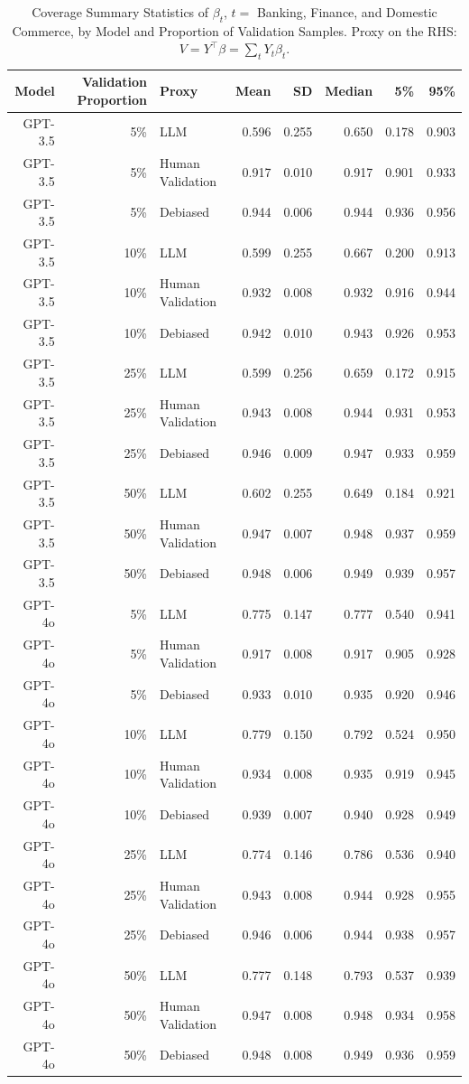 \begin{table}

\caption{\label{tab:unnamed-chunk-1}Coverage Summary Statistics of $\beta_{t}$, $t=$ Banking, Finance, and Domestic Commerce, by Model and Proportion of Validation Samples.
      Proxy on the RHS: $V = Y^\top \beta = \sum_{t} Y_t \beta_t$.}
\centering
\begin{tabular}[t]{rrlrrrrr}
\toprule
Model & Validation Proportion & Proxy & Mean & SD & Median & 5\% & 95\%\\
\midrule
GPT-3.5 & 5\% & LLM & 0.596 & 0.255 & 0.650 & 0.178 & 0.903\\
GPT-3.5 & 5\% & Human Validation & 0.917 & 0.010 & 0.917 & 0.901 & 0.933\\
GPT-3.5 & 5\% & Debiased & 0.944 & 0.006 & 0.944 & 0.936 & 0.956\\
GPT-3.5 & 10\% & LLM & 0.599 & 0.255 & 0.667 & 0.200 & 0.913\\
GPT-3.5 & 10\% & Human Validation & 0.932 & 0.008 & 0.932 & 0.916 & 0.944\\
GPT-3.5 & 10\% & Debiased & 0.942 & 0.010 & 0.943 & 0.926 & 0.953\\
GPT-3.5 & 25\% & LLM & 0.599 & 0.256 & 0.659 & 0.172 & 0.915\\
GPT-3.5 & 25\% & Human Validation & 0.943 & 0.008 & 0.944 & 0.931 & 0.953\\
GPT-3.5 & 25\% & Debiased & 0.946 & 0.009 & 0.947 & 0.933 & 0.959\\
GPT-3.5 & 50\% & LLM & 0.602 & 0.255 & 0.649 & 0.184 & 0.921\\
GPT-3.5 & 50\% & Human Validation & 0.947 & 0.007 & 0.948 & 0.937 & 0.959\\
GPT-3.5 & 50\% & Debiased & 0.948 & 0.006 & 0.949 & 0.939 & 0.957\\
GPT-4o & 5\% & LLM & 0.775 & 0.147 & 0.777 & 0.540 & 0.941\\
GPT-4o & 5\% & Human Validation & 0.917 & 0.008 & 0.917 & 0.905 & 0.928\\
GPT-4o & 5\% & Debiased & 0.933 & 0.010 & 0.935 & 0.920 & 0.946\\
GPT-4o & 10\% & LLM & 0.779 & 0.150 & 0.792 & 0.524 & 0.950\\
GPT-4o & 10\% & Human Validation & 0.934 & 0.008 & 0.935 & 0.919 & 0.945\\
GPT-4o & 10\% & Debiased & 0.939 & 0.007 & 0.940 & 0.928 & 0.949\\
GPT-4o & 25\% & LLM & 0.774 & 0.146 & 0.786 & 0.536 & 0.940\\
GPT-4o & 25\% & Human Validation & 0.943 & 0.008 & 0.944 & 0.928 & 0.955\\
GPT-4o & 25\% & Debiased & 0.946 & 0.006 & 0.944 & 0.938 & 0.957\\
GPT-4o & 50\% & LLM & 0.777 & 0.148 & 0.793 & 0.537 & 0.939\\
GPT-4o & 50\% & Human Validation & 0.947 & 0.008 & 0.948 & 0.934 & 0.958\\
GPT-4o & 50\% & Debiased & 0.948 & 0.008 & 0.949 & 0.936 & 0.959\\
\bottomrule
\end{tabular}
\end{table}
